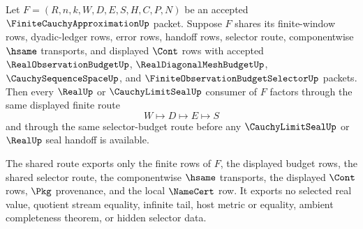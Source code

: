 \begin{theorem}
\label{thm:finite-cauchy-approximation-shared-budget-nonescape}
Let $F=(R,n,k,W,D,E,S,H,C,P,N)$ be an accepted $\FiniteCauchyApproximationUp$ packet. Suppose $F$ shares its finite-window rows, dyadic-ledger rows, error rows, handoff rows, selector route, componentwise $\hsame$ transports, and displayed $\Cont$ rows with accepted $\RealObservationBudgetUp$, $\RealDiagonalMeshBudgetUp$, $\CauchySequenceSpaceUp$, and $\FiniteObservationBudgetSelectorUp$ packets. Then every $\RealUp$ or $\CauchyLimitSealUp$ consumer of $F$ factors through the same displayed finite route
$$
W \longmapsto D \longmapsto E \longmapsto S
$$
and through the same selector-budget route before any $\CauchyLimitSealUp$ or $\RealUp$ seal handoff is available.

The shared route exports only the finite rows of $F$, the displayed budget rows, the shared selector route, the componentwise $\hsame$ transports, the displayed $\Cont$ rows, $\Pkg$ provenance, and the local $\NameCert$ row. It exports no selected real value, quotient stream equality, infinite tail, host metric or equality, ambient completeness theorem, or hidden selector data.
\end{theorem}
